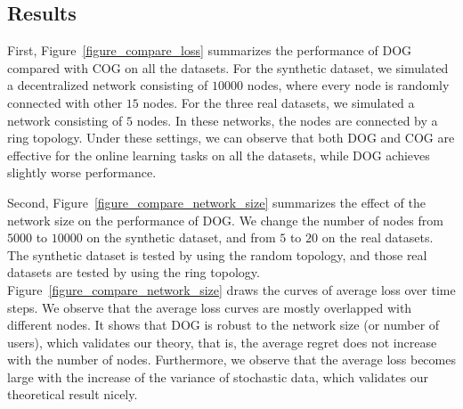 \documentclass{article}
\begin{document}
\subsection{Results}

First, Figure~\ref{figure_compare_loss} summarizes the performance of DOG compared with COG on all the datasets. 
For the synthetic dataset, we simulated a decentralized network consisting of $10000$ nodes, where every node is randomly connected with other $15$ nodes.
For the three real datasets, we simulated a network consisting of $5$ nodes. 
In these networks, the nodes are connected by a ring topology. 
Under these settings, we can observe that both DOG and COG are effective for the online learning tasks on all the datasets, while DOG achieves slightly worse performance. 



Second, Figure~\ref{figure_compare_network_size} summarizes the effect of the network size on the performance of DOG. We change the number of nodes from $5000$ to $10000$ on the synthetic dataset, and from $5$ to $20$ on the real datasets. The synthetic dataset is tested by using the random topology, and those real datasets are tested by using the ring topology. Figure~\ref{figure_compare_network_size} draws the curves of average loss over time steps. We observe that the average loss curves are mostly overlapped with different nodes. It shows that DOG is robust to the network size (or number of users), which validates our theory, that is, the average regret does not increase with the number of nodes. Furthermore, we observe that the average loss becomes large with the increase of the variance of stochastic data, which validates our theoretical result nicely.  
\end{document}
